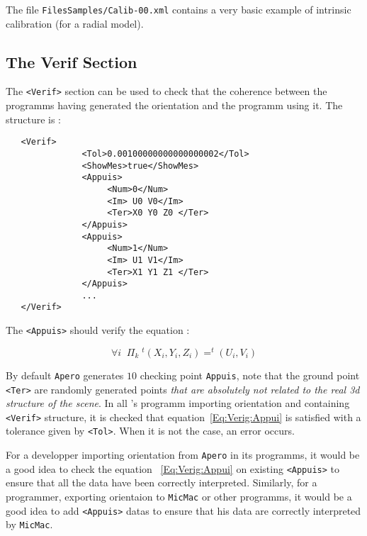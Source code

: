 The file {\tt FilesSamples/Calib-00.xml} contains a very basic example of intrinsic
calibration (for a radial model).


\subsection{The Verif Section}

The {\tt  <Verif>} section can be used to check that the coherence between the programms
having generated the orientation and the programm using it. The structure is :

\begin{verbatim}
   <Verif>
               <Tol>0.00100000000000000002</Tol>
               <ShowMes>true</ShowMes>
               <Appuis>
                    <Num>0</Num>
                    <Im> U0 V0</Im>
                    <Ter>X0 Y0 Z0 </Ter>
               </Appuis>
               <Appuis>
                    <Num>1</Num>
                    <Im> U1 V1</Im>
                    <Ter>X1 Y1 Z1 </Ter>
               </Appuis>
               ...
   </Verif>
\end{verbatim}

The {\tt <Appuis>} should verify the equation :

\begin{equation}
   \forall i \; \; \Pi_k \;  ^t(X_i,Y_i,Z_i) = ^t(U_i,V_i)   \label{Eq:Verig:Appui}
\end{equation}


By default {\tt Apero} generates $10$ checking point {\tt Appuis}, note that the ground
point {\tt <Ter>} are randomly generated points \emph{that are absolutely not related to
the real 3d structure of the scene}. In all \ELISE's  programm importing orientation and containing
{\tt <Verif>} structure, it is checked that equation~\ref{Eq:Verig:Appui} is satisfied with a
tolerance given by {\tt <Tol>}. When it is not the case, an error occurs.

For a developper importing orientation from {\tt Apero} in its programms, it would be a good idea to check
the equation ~\ref{Eq:Verig:Appui} on existing  {\tt <Appuis>} to ensure that all the data
have been correctly interpreted. Similarly, for a programmer, exporting orientaion to {\tt MicMac}
or other programms, it would be a good idea  to add {\tt <Appuis>} datas to ensure that his
data are correctly interpreted by  {\tt MicMac}.





